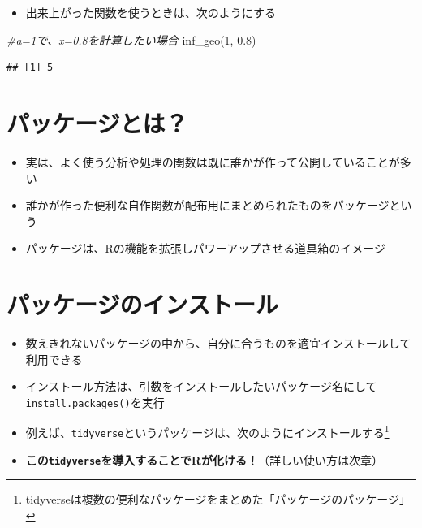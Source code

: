 \documentclass[
]{book}
\newenvironment{Shaded}{\begin{snugshade}}{\end{snugshade}}
\newcommand{\CommentTok}[1]{\textcolor[rgb]{0.56,0.35,0.01}{\textit{#1}}}
\newcommand{\DecValTok}[1]{\textcolor[rgb]{0.00,0.00,0.81}{#1}}
\newcommand{\FloatTok}[1]{\textcolor[rgb]{0.00,0.00,0.81}{#1}}
\newcommand{\FunctionTok}[1]{\textcolor[rgb]{0.00,0.00,0.00}{#1}}
\newcommand{\NormalTok}[1]{#1}
\providecommand{\tightlist}{%
  \setlength{\itemsep}{0pt}\setlength{\parskip}{0pt}}
\begin{document}
\begin{itemize}
\tightlist
\item
  出来上がった関数を使うときは、次のようにする
\end{itemize}

\begin{Shaded}
\begin{Highlighting}[]
\CommentTok{\#a=1で、x=0.8を計算したい場合}
\FunctionTok{inf\_geo}\NormalTok{(}\DecValTok{1}\NormalTok{, }\FloatTok{0.8}\NormalTok{)}
\end{Highlighting}
\end{Shaded}

\begin{verbatim}
## [1] 5
\end{verbatim}

\hypertarget{ux30d1ux30c3ux30b1ux30fcux30b8ux3068ux306f}{%
\section{パッケージとは？}\label{ux30d1ux30c3ux30b1ux30fcux30b8ux3068ux306f}}

\begin{itemize}
\tightlist
\item
  実は、よく使う分析や処理の関数は既に誰かが作って公開していることが多い
\item
  誰かが作った便利な自作関数が配布用にまとめられたものをパッケージという
\item
  パッケージは、Rの機能を拡張しパワーアップさせる道具箱のイメージ
\end{itemize}

\hypertarget{ux30d1ux30c3ux30b1ux30fcux30b8ux306eux30a4ux30f3ux30b9ux30c8ux30fcux30eb}{%
\section{パッケージのインストール}\label{ux30d1ux30c3ux30b1ux30fcux30b8ux306eux30a4ux30f3ux30b9ux30c8ux30fcux30eb}}

\begin{itemize}
\tightlist
\item
  数えきれないパッケージの中から、自分に合うものを適宜インストールして利用できる
\item
  インストール方法は、引数をインストールしたいパッケージ名にして\texttt{install.packages()}を実行
\item
  例えば、\texttt{tidyverse}というパッケージは、次のようにインストールする\footnote{tidyverseは複数の便利なパッケージをまとめた「パッケージのパッケージ」}
\item
  \textbf{この\texttt{tidyverse}を導入することでRが化ける！}（詳しい使い方は次章）
\end{itemize}
\end{document}
